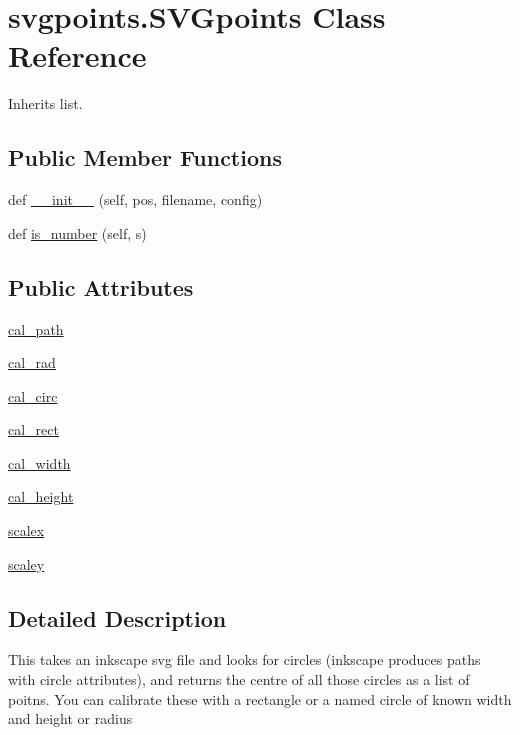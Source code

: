 \hypertarget{classsvgpoints_1_1_s_v_gpoints}{}\section{svgpoints.\+S\+V\+Gpoints Class Reference}
\label{classsvgpoints_1_1_s_v_gpoints}


Inherits list.

\subsection*{Public Member Functions}
\begin{DoxyCompactItemize}
\item 
def \hyperlink{classsvgpoints_1_1_s_v_gpoints_ac7451e9ed9ca9bb807c2508b273974cc}{\+\_\+\+\_\+init\+\_\+\+\_\+} (self, pos, filename, config)
\item 
def \hyperlink{classsvgpoints_1_1_s_v_gpoints_a5f45b2666fb66164bbc787885f72e823}{is\+\_\+number} (self, s)
\end{DoxyCompactItemize}
\subsection*{Public Attributes}
\begin{DoxyCompactItemize}
\item 
\hyperlink{classsvgpoints_1_1_s_v_gpoints_aa20b883f0dd0cbf5addfcc546e807b7c}{cal\+\_\+path}
\item 
\hyperlink{classsvgpoints_1_1_s_v_gpoints_a07cb40efc0d321f44952564032650be3}{cal\+\_\+rad}
\item 
\hyperlink{classsvgpoints_1_1_s_v_gpoints_a2bebb2c0ad793d166abfc4fae60f43c7}{cal\+\_\+circ}
\item 
\hyperlink{classsvgpoints_1_1_s_v_gpoints_a9f6f1c714d41a91f03ba410a8c72cbf6}{cal\+\_\+rect}
\item 
\hyperlink{classsvgpoints_1_1_s_v_gpoints_a95e111b7ea626b3531bf219c2467fb78}{cal\+\_\+width}
\item 
\hyperlink{classsvgpoints_1_1_s_v_gpoints_a433ae4f0659802a86e4518dfffe74d8f}{cal\+\_\+height}
\item 
\hyperlink{classsvgpoints_1_1_s_v_gpoints_a037cce810ad33fdfdb41159f24d42ca0}{scalex}
\item 
\hyperlink{classsvgpoints_1_1_s_v_gpoints_a3e0367d807f3527f3e58460118a33fad}{scaley}
\end{DoxyCompactItemize}


\subsection{Detailed Description}
\begin{DoxyVerb}This takes an inkscape svg file and looks for circles (inkscape produces paths with circle attributes), and returns the centre of all those circles as a list of poitns.
You can calibrate these with a rectangle or a named circle of known width and height or radius\end{DoxyVerb}
 

